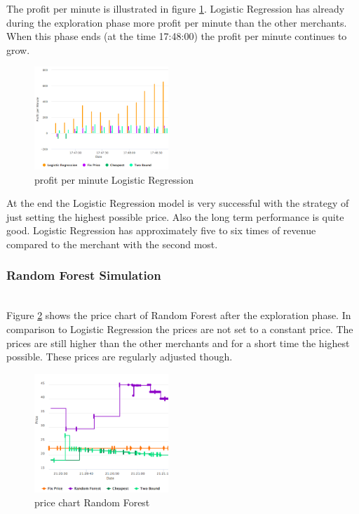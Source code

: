     The profit per minute is illustrated in figure \ref{fig4}. Logistic Regression has already during the exploration phase more profit per minute than the other merchants. When this phase ends (at the time 17:48:00) the profit per minute continues to grow.

    \begin{figure}[ht]
        \centering
        \includegraphics[width=0.45\textwidth]{img/logit_profit_per_min.png}
        \caption{profit per minute Logistic Regression}
        \label{fig4}
    \end{figure}

    At the end the Logistic Regression model is very successful with the strategy of just setting the highest possible price. Also the long term performance is quite good. Logistic Regression has approximately five to six times of revenue compared to the merchant with the second most.


\subsubsection{Random Forest Simulation}
    ~\\
    Figure \ref{fig5} shows the price chart of Random Forest after the exploration phase. In comparison to Logistic Regression the prices are not set to a constant price. The prices are still higher than the other merchants and for a short time the highest possible. These prices are regularly adjusted though.
    \begin{figure}[ht]
        \centering
        \includegraphics[width=0.45\textwidth]{img/rndmfrst_prices.png}
        \caption{price chart Random Forest}
        \label{fig5}
    \end{figure}

